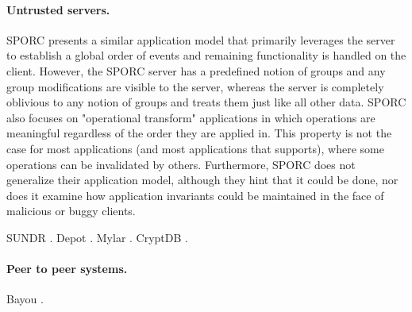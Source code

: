 \paragraph{Untrusted servers.}
SPORC \cite{sporc} presents a similar application model that primarily leverages the server to establish a global order of events and remaining functionality is handled on the client. However, the SPORC server has a predefined notion of groups and any group modifications are visible to the server, whereas the \name server is completely oblivious to any notion of groups and treats them just like all other data. SPORC also focuses on "operational transform" applications in which operations are meaningful regardless of the order they are applied in. This property is not the case for most applications (and most applications that \name supports), where some operations can be invalidated by others. Furthermore, SPORC does not generalize their application model, although they hint that it could be done, nor does it examine how application invariants could be maintained in the face of malicious or buggy clients. 

SUNDR \cite{sundr}.
Depot \cite{depot}.
Mylar \cite{mylar}.
CryptDB \cite{cryptdb}.

\paragraph{Peer to peer systems.}

Bayou \cite{}.
